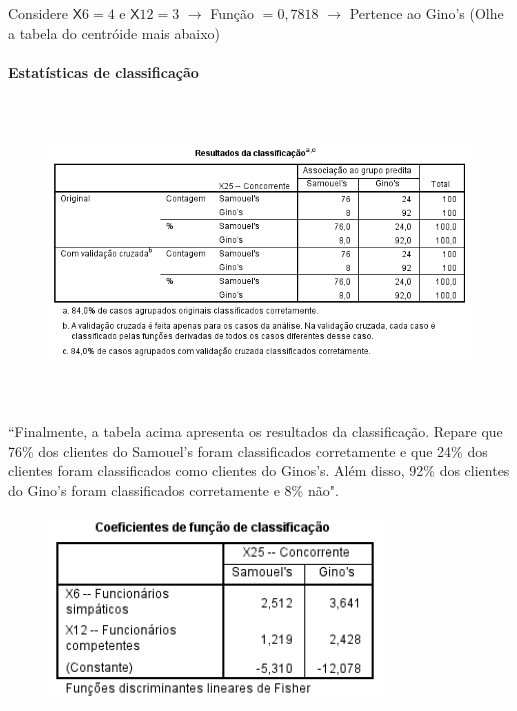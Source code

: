 				\bigskip

				Considere $\mathsf{X}6 = 4$ e  $\mathsf{X}12 = 3$ $\rightarrow$ Função $= 0,7818$ $\rightarrow$ Pertence ao Gino's (Olhe a tabela do centróide mais abaixo)
				
			\paragraph{Estatísticas de classificação} \hspace{0cm}

				\begin{figure}[H]
					\centering
					\includegraphics[height=8cm]{images/analise-discriminante_classificacao_resultados}
				\end{figure}

				``Finalmente, a tabela acima apresenta os resultados da classificação. Repare que 76\% dos clientes do Samouel's foram classificados corretamente e que 24\% dos clientes foram classificados como clientes do Ginos's. Além disso, 92\% dos clientes do Gino's foram classificados corretamente e 8\% não".

				\begin{figure}[H]
					\centering
					\includegraphics[height=5cm]{images/analise-discriminante_classificacao_coeficientes-de-funcao}
				\end{figure}

